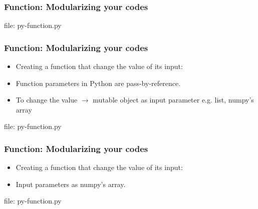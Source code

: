 \begin{frame}[fragile]
\frametitle{Function: Modularizing your codes}
\newcommand{\newfilename}{py-function.py}



file: \newfilename
\end{frame}


\begin{frame}[fragile]
\frametitle{Function: Modularizing your codes}
\newcommand{\newfilename}{py-function.py}
\begin{itemize}
\item Creating a function that change the value of its input: 



\item Function parameters in Python are pass-by-reference.
\item To change the value $\longrightarrow$ mutable object as input parameter e.g. list, numpy's array

\end{itemize}

file: \newfilename
\end{frame}


\begin{frame}[fragile]
\frametitle{Function: Modularizing your codes}
\newcommand{\newfilename}{py-function.py}
\begin{itemize}
\item Creating a function that change the value of its input: 



\item Input parameters as numpy's array.



\end{itemize}

file: \newfilename
\end{frame}

